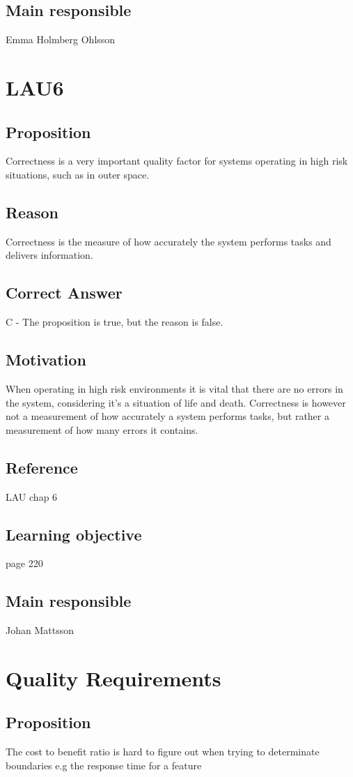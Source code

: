 \documentclass[a4paper]{article}
\begin{document}
\subsection*{Main responsible}
Emma Holmberg Ohlsson


\section{LAU6}
\subsection*{Proposition}
Correctness is a very important quality factor for systems operating in high risk situations, such as in outer space.
\subsection*{Reason}
Correctness is the measure of how accurately the system performs tasks and delivers information.
\subsection*{Correct Answer}
C - The proposition is true, but the reason is false.
\subsection*{Motivation}
When operating in high risk environments it is vital that there are no errors in the system, considering it’s a situation of life and death. Correctness is however not a measurement of how accurately a system performs tasks, but rather a measurement of how many errors it contains.
\subsection*{Reference}
LAU chap 6
\subsection*{Learning objective}
page 220
\subsection*{Main responsible}
Johan Mattsson

\section{Quality Requirements}
\subsection*{Proposition}
The cost to benefit ratio is hard to figure out when trying to determinate boundaries e.g the response time for a feature
\end{document}
